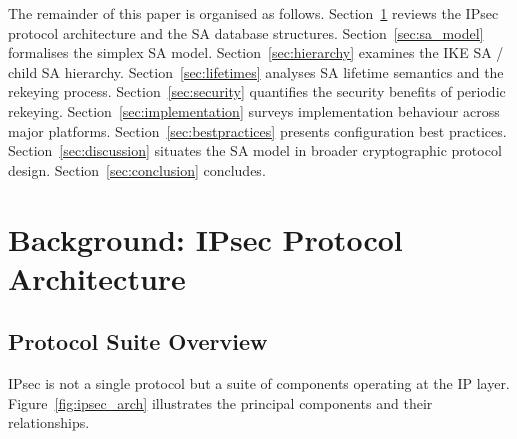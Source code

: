 \documentclass[sigconf,nonacm]{acmart}
\begin{document}
The remainder of this paper is organised as follows. Section~\ref{sec:background}
reviews the IPsec protocol architecture and the SA database structures.
Section~\ref{sec:sa_model} formalises the simplex SA model.
Section~\ref{sec:hierarchy} examines the IKE SA / child SA hierarchy.
Section~\ref{sec:lifetimes} analyses SA lifetime semantics and the rekeying process.
Section~\ref{sec:security} quantifies the security benefits of periodic rekeying.
Section~\ref{sec:implementation} surveys implementation behaviour across major platforms.
Section~\ref{sec:bestpractices} presents configuration best practices.
Section~\ref{sec:discussion} situates the SA model in broader cryptographic protocol
design. Section~\ref{sec:conclusion} concludes.

\section{Background: IPsec Protocol Architecture}
\label{sec:background}

\subsection{Protocol Suite Overview}

IPsec is not a single protocol but a suite of components operating at the IP layer.
Figure~\ref{fig:ipsec_arch} illustrates the principal components and their
relationships.
\end{document}
